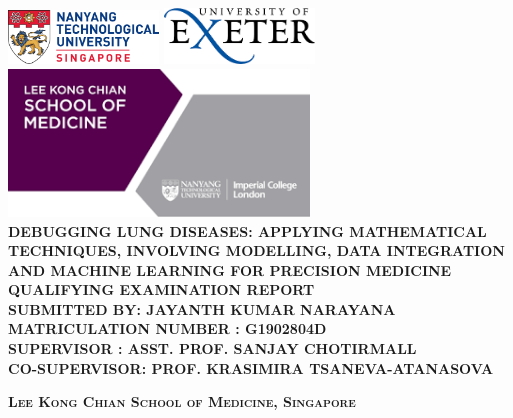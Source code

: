\begin{titlepage}
\begin{center}

\includegraphics[width=0.3\textwidth]{image/ntu_logo.png} \hfill \includegraphics[width=0.3\textwidth]{image/uoe_logo.png}
\\[2cm]
\includegraphics[width=0.6\textwidth]{image/lkc_logo.png}
\\[4cm]

\uppercase{\textbf{\Large{
Debugging Lung Diseases: Applying mathematical techniques, involving modelling, data integration and machine learning for precision medicine \\[2cm]
Qualifying Examination Report}}}
\\[2cm]

\uppercase{
\textbf{
Submitted by: Jayanth Kumar Narayana
}
\\
\textbf{
Matriculation Number : G1902804D
}
\\
\textbf{
	Supervisor : Asst. Prof. Sanjay Chotirmall
}
\\
\textbf{
	Co-Supervisor: Prof. Krasimira Tsaneva-Atanasova
}}

\vfill

\textsc{\bfseries Lee Kong Chian School of Medicine, Singapore}


\end{center}
\end{titlepage}